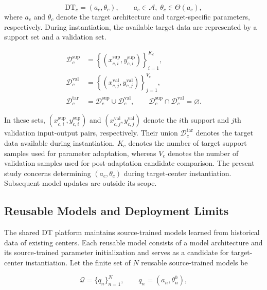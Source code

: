 \documentclass[a4paper,fleqn]{cas-sc}
\begin{document}
\begin{equation}
\mathrm{DT}_{c}
=
\left(
a_c,\theta_c
\right),
\qquad
a_c\in\mathcal{A},\;
\theta_c\in\Theta(a_c),
\label{eq:dt-instance}
\end{equation}
where \(a_c\) and \(\theta_c\) denote the target architecture and target-specific
parameters, respectively. During instantiation, the available target data are
represented by a support set and a validation set.

\begin{equation}
\begin{aligned}
\mathcal{D}_{c}^{\mathrm{sup}}
&=
\left\{
(x_{c,i}^{\mathrm{sup}},y_{c,i}^{\mathrm{sup}})
\right\}_{i=1}^{K_c},
\\
\mathcal{D}_{c}^{\mathrm{val}}
&=
\left\{
(x_{c,j}^{\mathrm{val}},y_{c,j}^{\mathrm{val}})
\right\}_{j=1}^{V_c},
\\
\mathcal{D}_{c}^{\mathrm{tar}}
&=
\mathcal{D}_{c}^{\mathrm{sup}}
\cup
\mathcal{D}_{c}^{\mathrm{val}},
\qquad
\mathcal{D}_{c}^{\mathrm{sup}}
\cap
\mathcal{D}_{c}^{\mathrm{val}}
=
\varnothing .
\end{aligned}
\label{eq:target-data}
\end{equation}

In these sets,
$(x_{c,i}^{\mathrm{sup}},y_{c,i}^{\mathrm{sup}})$ and
$(x_{c,j}^{\mathrm{val}},y_{c,j}^{\mathrm{val}})$ denote the $i$th support
and $j$th validation input-output pairs, respectively. Their union
$\mathcal{D}_{c}^{\mathrm{tar}}$ denotes the target data available during
instantiation. $K_c$ denotes the number of target support samples used for
parameter adaptation, whereas $V_c$ denotes the number of validation samples
used for post-adaptation candidate comparison. The present study concerns
determining $(a_c,\theta_c)$ during target-center instantiation. Subsequent
model updates are outside its scope.

\subsection{Reusable Models and Deployment Limits}

The shared DT platform maintains source-trained models learned from historical
data of existing centers. Each reusable model consists of a model architecture
and its source-trained parameter initialization and serves as a candidate for
target-center instantiation. Let the finite set of $N$ reusable source-trained
models be

\begin{equation}
\mathcal{Q}=\{q_n\}_{n=1}^{N},
\qquad
q_n=(a_n,\theta_n^0),
\label{eq:reusable-models}
\end{equation}
\end{document}
